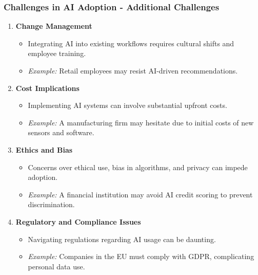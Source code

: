 \documentclass{beamer}
\begin{document}
\begin{frame}[fragile]
    \frametitle{Challenges in AI Adoption - Additional Challenges}
    \begin{enumerate}[resume]
        \item \textbf{Change Management}
        \begin{itemize}
            \item Integrating AI into existing workflows requires cultural shifts and employee training.
            \item \textit{Example:} Retail employees may resist AI-driven recommendations.
        \end{itemize}

        \item \textbf{Cost Implications}
        \begin{itemize}
            \item Implementing AI systems can involve substantial upfront costs.
            \item \textit{Example:} A manufacturing firm may hesitate due to initial costs of new sensors and software.
        \end{itemize}

        \item \textbf{Ethics and Bias}
        \begin{itemize}
            \item Concerns over ethical use, bias in algorithms, and privacy can impede adoption.
            \item \textit{Example:} A financial institution may avoid AI credit scoring to prevent discrimination.
        \end{itemize}

        \item \textbf{Regulatory and Compliance Issues}
        \begin{itemize}
            \item Navigating regulations regarding AI usage can be daunting.
            \item \textit{Example:} Companies in the EU must comply with GDPR, complicating personal data use.
        \end{itemize}
    \end{enumerate}
\end{frame}
\end{document}
